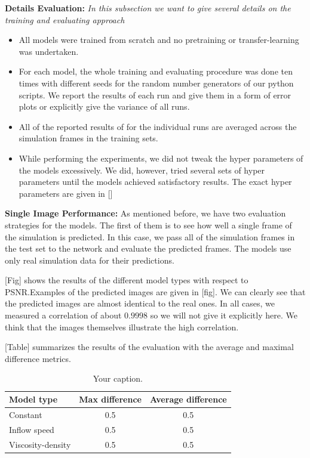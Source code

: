 \documentclass{llncs}
\begin{document}
\noindent\textbf{Details Evaluation:}
\emph{In this subsection we want to give several details on the training and evaluating approach}
\begin{itemize}
\item All models were trained from scratch and no pretraining or transfer-learning was undertaken.
\item For each model, the whole training and evaluating procedure was done ten times with different seeds for the random number generators of our python scripts. We report the results of each run and give them in a form of error plots or explicitly give the variance of all runs.
\item All of the reported results of for the individual runs are averaged across the simulation frames in the training sets.
\item While performing the experiments, we did not tweak the hyper parameters of the models excessively. We did, however, tried several sets of hyper parameters until the models achieved satisfactory results. The exact hyper parameters are given in []
\end{itemize}

\noindent\textbf{Single Image Performance:}
As mentioned before, we have two evaluation strategies for the models. The first of them is to see how well a single frame of the simulation is predicted. In this case, we pass all of the simulation frames in the test set to the network and evaluate the predicted frames. The models use only real simulation data for their predictions.

[Fig] shows the results of the different model types with respect to PSNR.\@ Examples of the predicted images are given in [fig]. We can clearly see that the predicted images are almost identical to the real ones. In all cases, we measured a correlation of about $0.9998$ so we will not give it explicitly here. We think that the images themselves illustrate the high correlation.

[Table] summarizes the results of the evaluation with the average and maximal difference metrics.


\begin{table}
  \begin{center}
    \begin{tabular}{l|c|c}
      Model type & Max difference &  Average difference\\
      \hline
      Constant & 0.5 &  0.5 \\
      Inflow speed &  0.5 &  0.5 \\
      Viscosity-density &  0.5  &  0.5 \\
    \end{tabular}
  \end{center}
  \caption{\label{tab:table-name} Your caption.}
\end{table}
\end{document}
